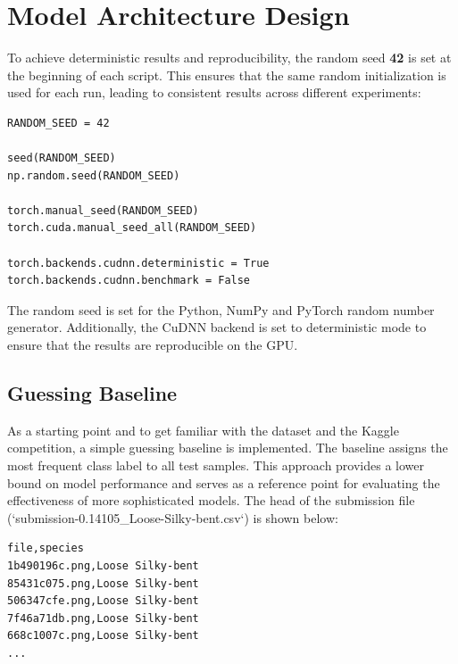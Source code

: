 \section{Model Architecture Design}

To achieve deterministic results and reproducibility, the random seed \textbf{42} is set at the beginning of each script. This ensures that the same random initialization is used for each run, leading to consistent results across different experiments:

\begin{minipage}{0.9\linewidth}\begin{lstlisting}[caption={Settings to achieve deterministic results and reproducibility.},label={lst:deterministic-results}]
RANDOM_SEED = 42

seed(RANDOM_SEED)
np.random.seed(RANDOM_SEED)

torch.manual_seed(RANDOM_SEED)
torch.cuda.manual_seed_all(RANDOM_SEED)

torch.backends.cudnn.deterministic = True
torch.backends.cudnn.benchmark = False
\end{lstlisting}\end{minipage}

The random seed is set for the Python, NumPy and PyTorch random number generator. Additionally, the CuDNN backend is set to deterministic mode to ensure that the results are reproducible on the GPU.

\subsection{Guessing Baseline}

As a starting point and to get familiar with the dataset and the Kaggle competition, a simple guessing baseline is implemented. The baseline assigns the most frequent class label to all test samples. This approach provides a lower bound on model performance and serves as a reference point for evaluating the effectiveness of more sophisticated models. The head of the submission file (`submission-0.14105\_Loose-Silky-bent.csv`) is shown below:

\begin{minipage}{0.9\linewidth}\begin{lstlisting}[language={},caption={Guessing baseline submission file.},label={lst:guessing-baseline}]
file,species
1b490196c.png,Loose Silky-bent
85431c075.png,Loose Silky-bent
506347cfe.png,Loose Silky-bent
7f46a71db.png,Loose Silky-bent
668c1007c.png,Loose Silky-bent
...
\end{lstlisting}\end{minipage}

